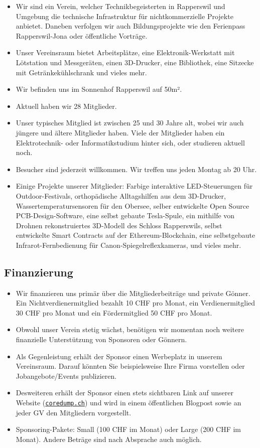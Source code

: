 \documentclass[10pt,a4paper,parskip,fleqn]{scrartcl}
\newcommand{\membercount}{28}
\begin{document}
\begin{itemize}
	\item Wir sind ein Verein, welcher Technikbegeisterten in Rapperswil und
		Umgebung die technische Infrastruktur für nichtkommerzielle Projekte
		anbietet. Daneben verfolgen wir auch Bildungsprojekte wie den Ferienpass
		Rapperswil-Jona oder öffentliche Vorträge.
	\item Unser Vereinsraum bietet Arbeitsplätze, eine Elektronik-Werkstatt mit
		Lötstation und Messgeräten, einen 3D-Drucker, eine Bibliothek, eine Sitzecke
		mit Getränkekühlschrank und vieles mehr.
	\item Wir befinden uns im Sonnenhof Rapperswil auf 50m².
	\item Aktuell haben wir \membercount{} Mitglieder.
	\item Unser typisches Mitglied ist zwischen 25 und 30 Jahre alt, wobei wir
		auch jüngere und ältere Mitglieder haben. Viele der Mitglieder haben ein
		Elektrotechnik- oder Informatikstudium hinter sich, oder studieren aktuell
		noch.
	\item Besucher sind jederzeit willkommen. Wir treffen uns jeden Montag ab 20
		Uhr.
	\item Einige Projekte unserer Mitglieder: Farbige interaktive LED-Steuerungen
		für Outdoor-Festivals, orthopädische Alltagshilfen aus dem 3D-Drucker,
		Wassertemperatursensoren für den Obersee, selber entwickelte Open Source
		PCB-Design-Software, eine selbst gebaute Tesla-Spule, ein mithilfe von
		Drohnen rekonstruiertes 3D-Modell des Schloss Rapperswils, selbst
		entwickelte Smart Contracts auf der Ethereum-Blockchain, eine selbstgebaute
		Infrarot-Fernbedienung für Canon-Spiegelreflexkameras, und vieles mehr.
\end{itemize}

\subsection{Finanzierung}

\begin{itemize}
	\item Wir finanzieren uns primär über die Mitgliederbeiträge und private
		Gönner. Ein Nichtverdienermitglied bezahlt 10 CHF pro Monat, ein
		Verdienermitglied 30 CHF pro Monat und ein Fördermitglied 50 CHF pro Monat.
	\item Obwohl unser Verein stetig wächst, benötigen wir momentan noch weitere
		finanzielle Unterstützung von Sponsoren oder Gönnern.
	\item Als Gegenleistung erhält der Sponsor einen Werbeplatz in unserem
		Vereinsraum. Darauf könnten Sie beispielsweise Ihre Firma vorstellen oder
		Jobangebote/Events publizieren.
	\item Desweiteren erhält der Sponsor einen stets sichtbaren Link auf unserer
		Website (\href{https://www.coredump.ch/}{\texttt{coredump.ch}}) und wird in
		einem öffentlichen Blogpost sowie an jeder GV den Mitgliedern vorgestellt.
	\item Sponsoring-Pakete: Small (100 CHF im Monat) oder Large (200 CHF im
		Monat). Andere Beträge sind nach Absprache auch möglich.
\end{itemize}
\end{document}
